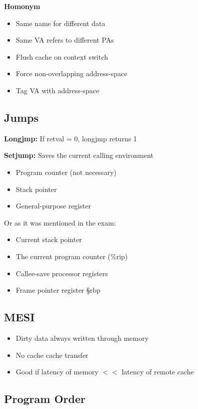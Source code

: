 \documentclass{article}
\begin{document}
\textbf{Homonym}
\begin{itemize}
    \item Same name for different data
    \item Same VA refers to different PAs
    \item Flush cache on context switch
    \item Force non-overlapping address-space
    \item Tag VA with address-space
\end{itemize}

\subsection{Jumps}

\textbf{Longjmp:} If retval = 0, longjmp returns 1

\textbf{Setjump:} Saves the current calling environment
\begin{itemize}
    \item Program counter (not necessary)
    \item Stack pointer
    \item General-purpose register
\end{itemize}

Or as it was mentioned in the exam:
\begin{itemize}
    \item Current stack pointer
    \item The current program counter (\%rip)
    \item Callee-save processor registers
    \item Frame pointer register §rbp
\end{itemize}

\subsection{MESI}

\begin{itemize}
    \item Dirty data always written through memory
    \item No cache cache transfer
    \item Good if latency of memory $<<$ latency of remote cache
\end{itemize}

\subsection{Program Order}
\end{document}
